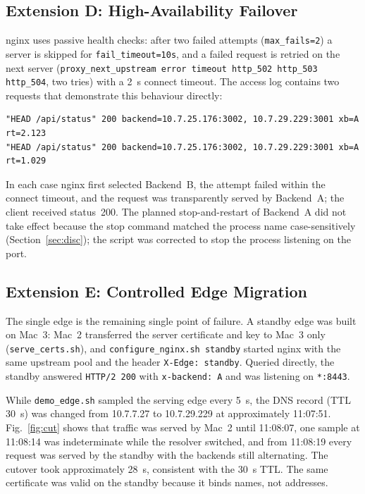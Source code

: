 \documentclass[conference,a4paper]{IEEEtran}
\newcommand{\code}[1]{\texttt{#1}}
\begin{document}
\subsection{Extension D: High-Availability Failover}
nginx uses passive health checks: after two failed attempts (\code{max\_fails=2}) a server is
skipped for \code{fail\_timeout=10s}, and a failed request is retried on the next server
(\code{proxy\_next\_upstream error timeout http\_502 http\_503 http\_504}, two tries) with a 2~s
connect timeout. The access log contains two requests that demonstrate this behaviour directly:
\begin{lstlisting}
"HEAD /api/status" 200 backend=10.7.25.176:3002, 10.7.29.229:3001 xb=A rt=2.123
"HEAD /api/status" 200 backend=10.7.25.176:3002, 10.7.29.229:3001 xb=A rt=1.029
\end{lstlisting}
In each case nginx first selected Backend~B, the attempt failed within the connect timeout, and
the request was transparently served by Backend~A; the client received status~200. The planned
stop-and-restart of Backend~A did not take effect because the stop command matched the process
name case-sensitively (Section~\ref{sec:disc}); the script was corrected to stop the process
listening on the port.

\subsection{Extension E: Controlled Edge Migration}
The single edge is the remaining single point of failure. A standby edge was built on Mac~3:
Mac~2 transferred the server certificate and key to Mac~3 only (\code{serve\_certs.sh}), and
\code{configure\_nginx.sh standby} started nginx with the same upstream pool and the header
\code{X-Edge: standby}. Queried directly, the standby answered \code{HTTP/2 200} with
\code{x-backend: A} and was listening on \code{*:8443}.

While \code{demo\_edge.sh} sampled the serving edge every 5~s, the DNS record (TTL 30~s) was
changed from 10.7.7.27 to 10.7.29.229 at approximately 11:07:51. Fig.~\ref{fig:cut} shows that
traffic was served by Mac~2 until 11:08:07, one sample at 11:08:14 was indeterminate while the
resolver switched, and from 11:08:19 every request was served by the standby with the backends
still alternating. The cutover took approximately 28~s, consistent with the 30~s TTL. The same
certificate was valid on the standby because it binds names, not addresses.
\end{document}
